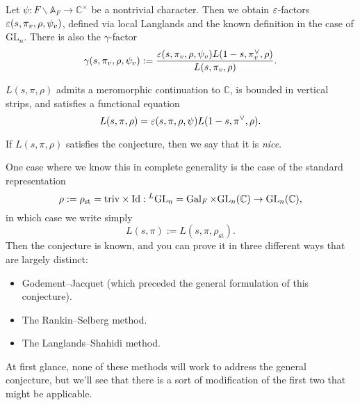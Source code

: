 \documentclass[reqno]{amsart} 
\begin{document}
Let $\psi : F \backslash \mathbb{A}_F \rightarrow \mathbb{C}^\times$ be a nontrivial character.  Then we obtain $\varepsilon$-factors $\varepsilon(s, \pi_v, \rho, \psi_v)$, defined via local Langlands and the known definition in the case of $\mathrm{GL}_n$.  There is also the $\gamma$-factor
\begin{equation*}
  \gamma(s, \pi_v, \rho, \psi_v) :=
  \frac{
    \varepsilon(s, \pi_v, \rho, \psi_v)
    L(1 - s, \pi_v^\vee, \rho)
  }{
    L(s, \pi_v, \rho)
  }.
\end{equation*}
\begin{conjecture}[Langlands]\label{conjecture:cq6tho7y7k}
  $L(s, \pi, \rho)$ admits a meromorphic continuation to $\mathbb{C}$, is bounded in vertical strips, and satisfies a functional equation
  \begin{equation*}
    L(s, \pi, \rho) = \varepsilon(s, \pi, \rho, \psi) L(1 - s, \pi^\vee, \rho).
  \end{equation*}
\end{conjecture}
If $L(s, \pi, \rho)$ satisfies the conjecture, then we say that it is \emph{nice}.

One case where we know this in complete generality is the case of the standard representation
\begin{equation*}
  \rho := \rho_{\mathrm{st}} = \mathrm{triv} \times \mathrm{Id} :{}^L \mathrm{GL}_n = \operatorname{Gal}_F \times \mathrm{GL}_n(\mathbb{C}) \rightarrow \mathrm{GL}_n(\mathbb{C}),
\end{equation*}
in which case we write simply
\begin{equation*}
  L(s, \pi) := L(s, \pi, \rho_{\mathrm{st}}).
\end{equation*}
Then the conjecture is known, and you can prove it in three different ways that are largely distinct:
\begin{itemize}
\item Godement--Jacquet (which preceded the general formulation of this conjecture).
\item The Rankin--Selberg method.
\item The Langlands--Shahidi method.
\end{itemize}
At first glance, none of these methods will work to address the general conjecture, but we'll see that there is a sort of modification of the first two that might be applicable.
\end{document}

